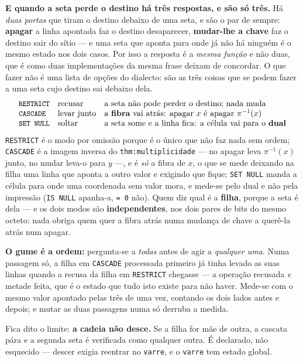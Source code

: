 \documentclass[11pt,a4paper]{article}
\newcommand{\code}[1]{\texttt{\small #1}}
\begin{document}
\medskip\noindent\textbf{E quando a seta perde o destino há três respostas, e
são só três.} Há \emph{duas portas} que tiram o destino debaixo de uma seta, e
são o par de sempre: \textbf{apagar} a linha apontada faz o destino
desaparecer, \textbf{mudar-lhe a chave} faz o destino sair do sítio --- e uma
seta que aponta para onde já não há ninguém é o mesmo estado nos dois casos.
Por isso a resposta é a \emph{mesma função} e não duas, que é como duas
implementações da mesma frase deixam de concordar. O que fazer não é uma lista
de opções do dialecto: são as três coisas que se podem fazer a uma seta cujo
destino sai debaixo dela.
\[
\begin{array}{lll}
\code{RESTRICT} & \text{recusar}     & \text{a seta não pode perder o destino; nada muda}\\
\code{CASCADE}  & \text{levar junto} & \text{a \textbf{fibra} vai atrás: apagar }x\text{ é apagar }\pi^{-1}(x)\\
\code{SET NULL} & \text{soltar}      & \text{a seta some e a linha fica: a célula vai para o \textbf{dual}}
\end{array}
\]
\code{RESTRICT} é o modo por omissão porque é o único que não faz nada sem
ordem; \code{CASCADE} é a imagem inversa do \code{thm:multiplicidade} --- no
apagar leva $\pi^{-1}(x)$ junto, no mudar leva-o para $y$ ---, e é \emph{só} a
fibra de $x$, o que se mede deixando na filha uma linha que aponta a outro valor
e exigindo que fique; \code{SET NULL} manda a célula para onde uma coordenada
sem valor mora, e mede-se pelo dual e não pela impressão (\code{IS NULL}
apanha-a, \code{= 0} não). Quem diz qual é a \textbf{filha}, porque a seta é
dela --- e os dois modos são \textbf{independentes}, nos dois pares de bits do
mesmo octeto: nada obriga quem quer a fibra atrás numa mudança de chave a
querê-la atrás num apagar.

\medskip\noindent\textbf{O gume é a ordem:} pergunta-se a \emph{todas} antes de
agir a \emph{qualquer uma}. Numa passagem só, a filha em \code{CASCADE}
processada primeiro já tinha levado as suas linhas quando a recusa da filha em
\code{RESTRICT} chegasse --- a operação recusada \emph{e} metade feita, que é o
estado que tudo isto existe para não haver. Mede-se com o mesmo valor apontado
pelas três de uma vez, contando os dois lados antes e depois; e mutar as duas
passagens numa só derruba a medida.

\medskip\noindent Fica dito o limite: \textbf{a cadeia não desce.} Se a filha
for mãe de outra, a cascata pára e a segunda seta é verificada como qualquer
outra. É declarado, não esquecido --- descer exigia reentrar no \code{varre}, e
o \code{varre} tem estado global.
\end{document}
